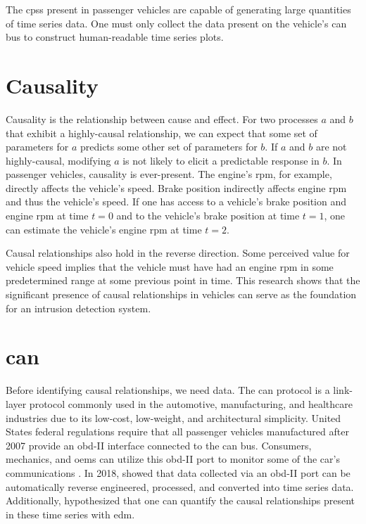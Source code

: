 \documentclass[12pt]{article}
\begin{document}
The \acp{cps} present in passenger vehicles are capable of generating large quantities of time series data. One must only collect the data present on the vehicle's \acl{can} bus to construct human-readable time series plots.

\section*{Causality}

Causality is the relationship between cause and effect. For two processes $a$ and $b$ that exhibit a highly-causal relationship, we can expect that some set of parameters for $a$ predicts some other set of parameters for $b$. If $a$ and $b$ are not highly-causal, modifying $a$ is not likely to elicit a predictable response in $b$. In passenger vehicles, causality is ever-present. The engine's \ac{rpm}, for example, directly affects the vehicle's speed. Brake position indirectly affects engine \ac{rpm} and thus the vehicle's speed. If one has access to a vehicle's brake position and engine \ac{rpm} at time $t=0$ and to the vehicle's brake position at time $t=1$, one can estimate the vehicle's engine \ac{rpm} at time $t=2$.

Causal relationships also hold in the reverse direction. Some perceived value for vehicle speed implies that the vehicle must have had an engine \ac{rpm} in some predetermined range at some previous point in time. This research shows that the significant presence of causal relationships in vehicles can serve as the foundation for an intrusion detection system.

\section*{\acf{can}}

Before identifying causal relationships, we need data. The \ac{can} protocol is a link-layer protocol commonly used in the automotive, manufacturing, and healthcare industries due to its low-cost, low-weight, and architectural simplicity. United States federal regulations require that all passenger vehicles manufactured after 2007 provide an \ac{obd}-II interface connected to the \ac{can} bus. Consumers, mechanics, and \acp{oem} can utilize this \ac{obd}-II port to monitor some of the car's communications \cite{ISO2012}. In 2018, \cite{Stone2018} showed that data collected via an \ac{obd}-II port can be automatically reverse engineered, processed, and converted into time series data. Additionally, \cite{Stone2018} hypothesized that one can quantify the causal relationships present in these time series with \ac{edm}.
\end{document}
